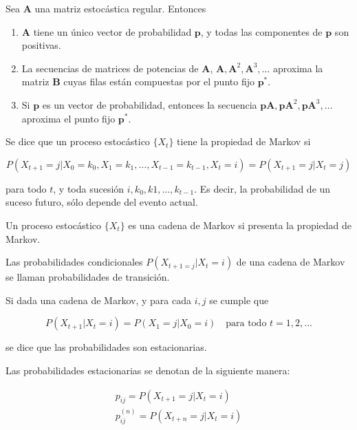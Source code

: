 \begin{teo}
Sea $\mathbf{A}$ una matriz estocástica regular. Entonces

\begin{enumerate}
\item $\mathbf{A}$ tiene un único vector de probabilidad $\mathbf{p}$, y todas las componentes de $\mathbf{p}$ son positivas.
\item La secuencias de matrices de potencias de $\mathbf{A}$, $\mathbf{A},\mathbf{A}^2,\mathbf{A}^3,\dots$ aproxima la matriz $\mathbf{B}$ cuyas filas están compuestas por el punto fijo $\mathbf{p}^*$.
\item Si $\mathbf{p}$ es un vector de probabilidad, entonces la secuencia $\mathbf{p A}, \mathbf{p} \mathbf{A}^2,\mathbf{p} \mathbf{A}^3,\dots$ aproxima el punto fijo $\mathbf{p}^*$.
\end{enumerate}
\end{teo}

\begin{defi}
Se dice que un proceso estocástico $\{X_t\}$ tiene la propiedad de Markov si 

\[ P(X_{t+1} = j | X_0 = k_0, X_1 = k_1,\dots, X_{t-1} = k_{t-1}, X_t = i) = P(X_{t+1} = j | X_t = j)\]

para todo $t$, y toda sucesión $i, k_0, k1, \dots, k_{t-1}$. Es decir, la probabilidad de un suceso futuro, sólo depende del evento actual. 
\end{defi}

\begin{defi}
Un proceso estocástico $\{X_t\}$ es una cadena de Markov si presenta la propiedad de Markov.
\end{defi}

\begin{defi}
Las probabilidades condicionales $P(X_{t+1 = j} | X_t = i)$ de una cadena de Markov se llaman probabilidades de transición.
\end{defi}

\begin{defi}
Si dada una cadena de Markov, y para cada $i, j$ se cumple que 

\[ P(X_{t+1} | X_t = i) = P(X_1 = j | X_0 = i) \quad \text{para todo $t=1,2,...$} \]

se dice que las probabilidades son estacionarias.
\end{defi}

Las probabilidades estacionarias se denotan de la siguiente manera:

\begin{eqnarray}
p_{ij} = P(X_{t+1} = j | X_t = i)\\
p_{ij}^{(n)} = P(X_{t+n} = j | X_t = i)
\end{eqnarray}

